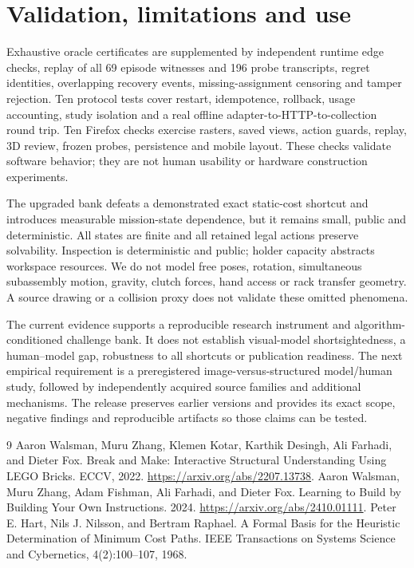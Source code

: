 \documentclass[10pt,twocolumn]{article}
\begin{document}
\section{Validation, limitations and use}
Exhaustive oracle certificates are supplemented by independent runtime
edge checks, replay of all 69 episode witnesses and 196 probe transcripts,
regret identities, overlapping recovery events, missing-assignment
censoring and tamper rejection. Ten protocol tests cover restart,
idempotence, rollback, usage accounting, study isolation and a real offline
adapter-to-HTTP-to-collection round trip. Ten Firefox checks exercise
rasters, saved views, action guards, replay, 3D review, frozen probes,
persistence and mobile layout. These checks validate software behavior;
they are not human usability or hardware construction experiments.

The upgraded bank defeats a demonstrated exact static-cost shortcut and
introduces measurable mission-state dependence, but it remains small,
public and deterministic. All states are finite and all retained legal
actions preserve solvability. Inspection is deterministic and public;
holder capacity abstracts workspace resources. We do not model free poses,
rotation, simultaneous subassembly motion, gravity, clutch forces, hand
access or rack transfer geometry. A source drawing or a collision proxy
does not validate these omitted phenomena.

The current evidence supports a reproducible research instrument and
algorithm-conditioned challenge bank. It does not establish visual-model
shortsightedness, a human--model gap, robustness to all shortcuts or
publication readiness. The next empirical requirement is a preregistered
image-versus-structured model/human study, followed by independently
acquired source families and additional mechanisms. The release preserves
earlier versions and provides its exact scope, negative findings and
reproducible artifacts so those claims can be tested.

\begin{thebibliography}{9}\small
{}
Aaron Walsman, Muru Zhang, Klemen Kotar, Karthik Desingh, Ali Farhadi,
and Dieter Fox.
Break and Make: Interactive Structural Understanding Using LEGO Bricks.
ECCV, 2022. \url{https://arxiv.org/abs/2207.13738}.
Aaron Walsman, Muru Zhang, Adam Fishman, Ali Farhadi, and Dieter Fox.
Learning to Build by Building Your Own Instructions.
2024. \url{https://arxiv.org/abs/2410.01111}.
Peter E. Hart, Nils J. Nilsson, and Bertram Raphael.
A Formal Basis for the Heuristic Determination of Minimum Cost Paths.
IEEE Transactions on Systems Science and Cybernetics, 4(2):100--107, 1968.
\end{thebibliography}

\clearpage
\onecolumn
\appendix

\end{document}
